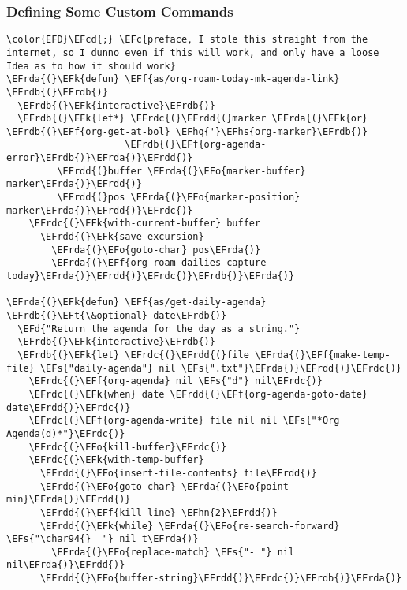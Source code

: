 \documentclass{article}
\newcommand{\EFc}[1]{\textcolor{EFc}{#1}} %
\newcommand{\EFcd}[1]{\textcolor{EFcd}{#1}} %
\newcommand{\EFs}[1]{\textcolor{EFs}{#1}} %
\newcommand{\EFd}[1]{\textcolor{EFd}{#1}} %
\newcommand{\EFk}[1]{\textcolor{EFk}{#1}} %
\newcommand{\EFf}[1]{\textcolor{EFf}{#1}} %
\newcommand{\EFt}[1]{\textcolor{EFt}{#1}} %
\newcommand{\EFo}[1]{\textcolor{EFo}{#1}} %
\newcommand{\EFhn}[1]{\textcolor{EFhn}{\textbf{#1}}} %
\newcommand{\EFhq}[1]{#1} %
\newcommand{\EFhs}[1]{\textcolor{EFhs}{#1}} %
\newcommand{\EFrda}[1]{\textcolor{EFrda}{#1}} %
\newcommand{\EFrdb}[1]{\textcolor{EFrdb}{#1}} %
\newcommand{\EFrdc}[1]{\textcolor{EFrdc}{#1}} %
\newcommand{\EFrdd}[1]{\textcolor{EFrdd}{#1}} %
\begin{document}
\subsubsection{Defining Some Custom Commands}
\label{sec:org9cde3ea}
\begin{Code}
\begin{Verbatim}
\color{EFD}\EFcd{;} \EFc{preface, I stole this straight from the internet, so I dunno even if this will work, and only have a loose Idea as to how it should work}
\EFrda{(}\EFk{defun} \EFf{as/org-roam-today-mk-agenda-link} \EFrdb{(}\EFrdb{)}
  \EFrdb{(}\EFk{interactive}\EFrdb{)}
  \EFrdb{(}\EFk{let*} \EFrdc{(}\EFrdd{(}marker \EFrda{(}\EFk{or} \EFrdb{(}\EFf{org-get-at-bol} \EFhq{'}\EFhs{org-marker}\EFrdb{)}
                     \EFrdb{(}\EFf{org-agenda-error}\EFrdb{)}\EFrda{)}\EFrdd{)}
         \EFrdd{(}buffer \EFrda{(}\EFo{marker-buffer} marker\EFrda{)}\EFrdd{)}
         \EFrdd{(}pos \EFrda{(}\EFo{marker-position} marker\EFrda{)}\EFrdd{)}\EFrdc{)}
    \EFrdc{(}\EFk{with-current-buffer} buffer
      \EFrdd{(}\EFk{save-excursion}
        \EFrda{(}\EFo{goto-char} pos\EFrda{)}
        \EFrda{(}\EFf{org-roam-dailies-capture-today}\EFrda{)}\EFrdd{)}\EFrdc{)}\EFrdb{)}\EFrda{)}

\EFrda{(}\EFk{defun} \EFf{as/get-daily-agenda} \EFrdb{(}\EFt{\&optional} date\EFrdb{)}
  \EFd{"Return the agenda for the day as a string."}
  \EFrdb{(}\EFk{interactive}\EFrdb{)}
  \EFrdb{(}\EFk{let} \EFrdc{(}\EFrdd{(}file \EFrda{(}\EFf{make-temp-file} \EFs{"daily-agenda"} nil \EFs{".txt"}\EFrda{)}\EFrdd{)}\EFrdc{)}
    \EFrdc{(}\EFf{org-agenda} nil \EFs{"d"} nil\EFrdc{)}
    \EFrdc{(}\EFk{when} date \EFrdd{(}\EFf{org-agenda-goto-date} date\EFrdd{)}\EFrdc{)}
    \EFrdc{(}\EFf{org-agenda-write} file nil nil \EFs{"*Org Agenda(d)*"}\EFrdc{)}
    \EFrdc{(}\EFo{kill-buffer}\EFrdc{)}
    \EFrdc{(}\EFk{with-temp-buffer}
      \EFrdd{(}\EFo{insert-file-contents} file\EFrdd{)}
      \EFrdd{(}\EFo{goto-char} \EFrda{(}\EFo{point-min}\EFrda{)}\EFrdd{)}
      \EFrdd{(}\EFf{kill-line} \EFhn{2}\EFrdd{)}
      \EFrdd{(}\EFk{while} \EFrda{(}\EFo{re-search-forward} \EFs{"\char94{}  "} nil t\EFrda{)}
        \EFrda{(}\EFo{replace-match} \EFs{"- "} nil nil\EFrda{)}\EFrdd{)}
      \EFrdd{(}\EFo{buffer-string}\EFrdd{)}\EFrdc{)}\EFrdb{)}\EFrda{)}
\end{Verbatim}
\end{Code}
\end{document}
